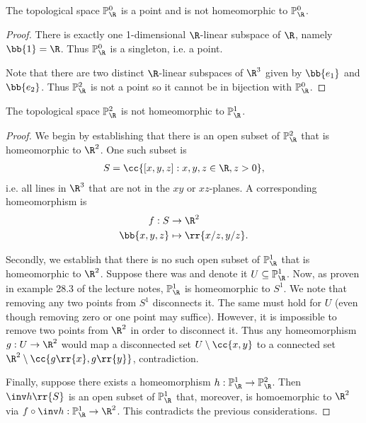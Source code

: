\documentclass{article}
\begin{document}
\begin{claim}
  The topological space $\mathbb P^0_{\R}$ is a point and is not homeomorphic to $\mathbb P^0_{\R}$.
  \begin{proof}
    There is exactly one 1-dimensional $\R$-linear subspace of $\R$,
    namely $\bb{1}=\R$. Thus $\mathbb P^0_{\R}$ is a singleton, i.e.
    a point.

    Note that there are two distinct $\R$-linear subspaces of $\R^3$ given by $\bb{e_1}$ and
    $\bb{e_2}$. Thus $\mathbb P^2_{\R}$ is not a point so it cannot be in bijection with $\mathbb P^0_{\R}$.
  \end{proof}
\end{claim}

\begin{claim}
  The topological space $\mathbb P^2_{\R}$ is not homeomorphic to $\mathbb P^1_{\R}$.
  \begin{proof}
    We begin by establishing that there is an open subset of $\mathbb P^2_{\R}$ that is
    homeomorphic to $\R^2$. One such subset is
    \begin{align*}
      S=\cc{[x,y,z] : x,y,z\in\R, z>0},
    \end{align*}
    i.e. all lines in $\R^3$ that are not in the $xy$ or $xz$-planes. A corresponding
    homeomorphism is
    \begin{align*}
      f:S &\to \R^2 \\
      \bb{x,y,z} &\mapsto \rr{x/z, y/z}.
    \end{align*}

    Secondly, we establish that there is no such open subset of $\mathbb P^1_{\R}$ that
    is homeomorphic to $\R^2$. Suppose there was and denote it $U\subseteq \mathbb P^1_{\R}$.
    Now, as proven in example 28.3 of the lecture notes, $\mathbb P^1_{\R}$ is homeomorphic 
    to $S^1$. We note that removing any two points from $S^1$ disconnects it.
    The same must hold for $U$ (even though removing zero or one point may suffice).
    However, it is impossible
    to remove two points from $\R^2$ in order to disconnect it. Thus any homeomorphism
    $g:U\to\R^2$ would map a disconnected set $U\setminus\cc{x,y}$ to a connected set
    $\R^2\setminus\cc{g\rr{x},g\rr{y}}$, contradiction.

    Finally, suppose there exists a homeomorphism $h:\mathbb P^1_{\R}\to\mathbb P^2_{\R}$.
    Then $\inv h\rr{S}$ is an open subset of $\mathbb P^1_{\R}$ that, moreover, is homoemorphic
    to $\R^2$ via $f\circ \inv h:\mathbb P^1_{\R}\to \R^2$. This contradicts the previous
    considerations.
  \end{proof}
\end{claim}
\end{document}
